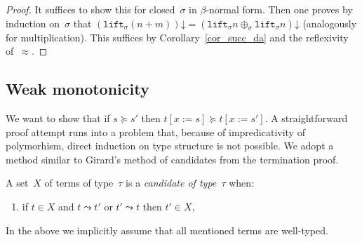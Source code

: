 \documentclass[runningheads,a4paper]{llncs}
\newcommand{\subst}[2]{#1:=#2}
\newcommand{\lift}{\mathtt{lift}}
\newcommand{\da}{\mathord{\downarrow}}
\begin{document}
\begin{proof}
  It suffices to show this for closed~$\sigma$ in $\beta$-normal
  form. Then one proves by induction on~$\sigma$ that
  $(\lift_\sigma(n+m))\da = (\lift_\sigma n \oplus_\sigma \lift_\sigma
  n)\da$ (analogously for multiplication). This suffices by
  Corollary~\ref{cor_succ_da} and the reflexivity of~$\approx$.
\end{proof}

\subsection{Weak monotonicity}\label{sec_weakly_monotone}

We want to show that if $s \succeq s'$ then $t[\subst{x}{s}] \succeq
t[\subst{x}{s'}]$. A straightforward proof attempt runs into a problem
that, because of impredicativity of polymorhism, direct induction on
type structure is not possible. We adopt a method similar to Girard's
method of candidates from the termination proof.

\begin{definition}\normalfont
  A set~$X$ of terms of type~$\tau$ is a \emph{candidate of
    type~$\tau$} when:
  \begin{enumerate}
  \item if $t \in X$ and $t \leadsto t'$ or $t' \leadsto t$ then $t'
    \in X$,
  \end{enumerate}
  In the above we implicitly assume that all mentioned terms are
  well-typed.
\end{definition}
\end{document}
